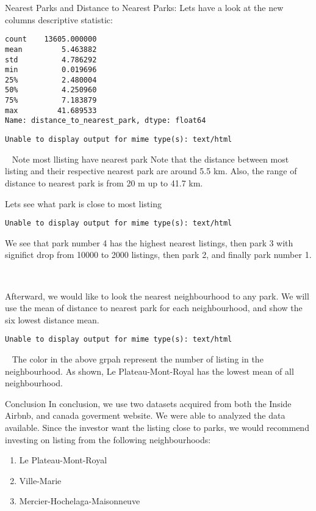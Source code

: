 \documentclass[
  ignorenonframetext,
]{beamer}
\providecommand{\tightlist}{%
  \setlength{\itemsep}{0pt}\setlength{\parskip}{0pt}}\usepackage{longtable,booktabs,array}
\begin{document}
\begin{frame}[fragile]{Nearest Parks and Distance to Nearest Parks:}
\protect\hypertarget{nearest-parks-and-distance-to-nearest-parks}{}
Lets have a look at the new columns descriptive statistic:

\begin{verbatim}
count    13605.000000
mean         5.463882
std          4.786292
min          0.019696
25%          2.480004
50%          4.250960
75%          7.183879
max         41.689533
Name: distance_to_nearest_park, dtype: float64
\end{verbatim}

\begin{verbatim}
Unable to display output for mime type(s): text/html
\end{verbatim}

~ Note most llisting have nearest park Note that the distance between
most listing and their respective nearest park are around 5.5 km. Also,
the range of distance to nearest park is from 20 m up to 41.7 km.

Lets see what park is close to most listing

\begin{verbatim}
Unable to display output for mime type(s): text/html
\end{verbatim}

\hfill\break

We see that park number 4 has the highest nearest listings, then park 3
with significt drop from 10000 to 2000 listings, then park 2, and
finally park number 1.

~

Afterward, we would like to look the nearest neighbourhood to any park.
We will use the mean of distance to nearest park for each neighbourhood,
and show the six lowest distance mean.

\begin{verbatim}
Unable to display output for mime type(s): text/html
\end{verbatim}

~ The color in the above grpah represent the number of listing in the
neighbourhood. As shown, Le Plateau-Mont-Royal has the lowest mean of
all neighbourhood.
\end{frame}

\begin{frame}{Conclusion}
\protect\hypertarget{conclusion}{}
In conclusion, we use two datasets acquired from both the Inside Airbnb,
and canada goverment website. We were able to analyzed the data
available. Since the investor want the listing close to parks, we would
recommend investing on listing from the following neighbourhoods:

\begin{enumerate}
[1)]
\tightlist
\item
  Le Plateau-Mont-Royal
\item
  Ville-Marie
\item
  Mercier-Hochelaga-Maisonneuve
\end{enumerate}
\end{frame}
\end{document}
